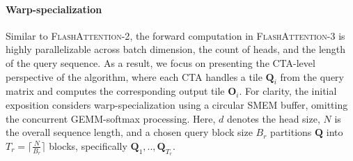 \paragraph{Warp-specialization}
Similar to \textsc{FlashAttention-2}, the forward computation in \textsc{FlashAttention-3} is highly parallelizable across batch dimension, the count of heads, and the length of the query sequence. As a result, we focus on presenting the CTA-level perspective of the algorithm, where each CTA handles a tile $\mathbf{Q}_i$ from the query matrix and computes the corresponding output tile $\mathbf{O}_i$. For clarity, the initial exposition considers warp-specialization using a circular SMEM buffer, omitting the concurrent GEMM-softmax processing. Here, $d$ denotes the head size, $N$ is the overall sequence length, and a chosen query block size $B_r$ partitions $\mathbf{Q}$ into $T_r = \lceil \frac{N}{B_r} \rceil$ blocks, specifically $\mathbf{Q}_1, .., \mathbf{Q}_{T_r}$.

